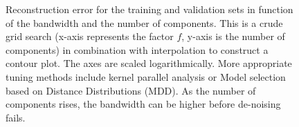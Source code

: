 \begin{figure}[!htb]
\centering
{}\hfil
{}\hfil
{}\hfil
\caption{Reconstruction error for the training and validation sets in function of the bandwidth and the number of components. This is a crude grid search (x-axis represents the factor $f$, y-axis is the number of components) in combination with interpolation to construct a contour plot. The axes are scaled logarithmically. More appropriate tuning methods include kernel parallel analysis or Model selection based on Distance Distributions (MDD). As the number of components rises, the bandwidth can be higher before de-noising fails.}
\label{uspserror}
\end{figure}

